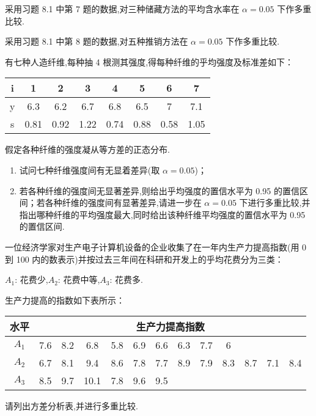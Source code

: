 \begin{xiti}
  \item 采用习题 8.1 中第 7 题的数据,对三种储藏方法的平均含水率在 $\alpha = 0.05$ 下作多重比较.
  \item 采用习题 8.1 中第 8 题的数据,对五种推销方法在 $\alpha = 0.05$ 下作多重比较.
  \item 有七种人造纤维,每种抽 4 根测其强度,得每种纤维的乎均强度及标准差如下：
  \begin{center}
    \begin{tabular}{cccccccc}
      \toprule
      i     & 1     & 2     & 3     & 4     & 5     & 6     & 7 \\
      \midrule
      y     & 6.3   & 6.2   & 6.7   & 6.8   & 6.5   & 7     & 7.1 \\
      s     & 0.81  & 0.92  & 1.22  & 0.74  & 0.88  & 0.58  & 1.05 \\
      \bottomrule
      \end{tabular}%
  \end{center}
  假定各种纤维的强度凝从等方差的正态分布.
  \begin{enumerate}
    \item 试问七种纤维强度间有无显着差异(取 $\alpha=0.05$)；
    \item 若各种纤维的强度间无显著差异,则给出乎均强度的置信水平为 0.95 的置信区间；若各种纤维的强度间有显著差异,请进一步在 $\alpha=0.05$ 下进行多重比较,并指出哪种纤维的平均强度最大,同时给出该种纤维平均强度的置信水平为 0.95 的置信区间.
  \end{enumerate}
  \item 一位经济学家对生产电子计算机设备的企业收集了在一年内生产力提高指数(用 0 到 100 内的数表示)并按过去三年间在科研和开发上的乎均花费分为三类：
  \begin{center}
    $A_1$: 花费少,\quad $A_2$: 花费中等,\quad $A_3$: 花费多.
  \end{center}
生产力提高的指数如下表所示：
\begin{center}
  \begin{tabular}{ccccccccccccc}
    \toprule
    水平    & \multicolumn{12}{c}{生产力提高指数} \\
    \midrule
    $A_1$    & 7.6   & 8.2   & 6.8   & 5.8   & 6.9   & 6.6   & 6.3   & 7.7   & 6     &       &       &  \\
    $A_2$    & 6.7   & 8.1   & 9.4   & 8.6   & 7.8   & 7.7   & 8.9   & 7.9   & 8.3   & 8.7   & 7.1   & 8.4 \\
    $A_3$    & 8.5   & 9.7   & 10.1  & 7.8   & 9.6   & 9.5   &       &       &       &       &       &  \\
    \bottomrule
    \end{tabular}%
\end{center}
请列出方差分析表,并进行多重比较.
\end{xiti}


